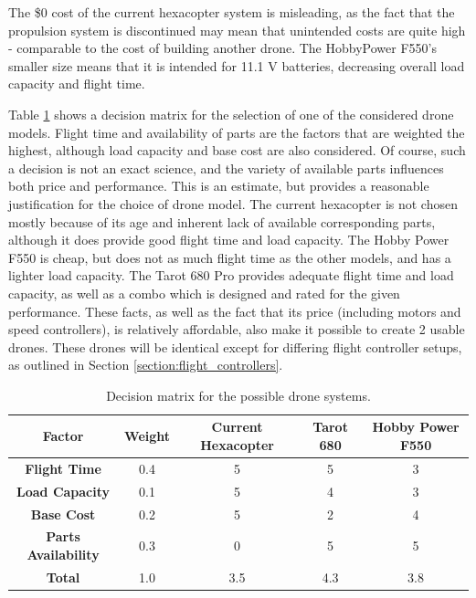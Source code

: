The \$0 cost of the current hexacopter system is misleading, as the fact that the propulsion system is discontinued may mean that unintended costs are quite high - comparable to the cost of building another drone. The HobbyPower F550's smaller size means that it is intended for 11.1 V batteries, decreasing overall load capacity and flight time.

Table \ref{tab:decision_matrix} shows a decision matrix for the selection of one of the considered drone models. Flight time and availability of parts are the factors that are weighted the highest, although load capacity and base cost are also considered. Of course, such a decision is not an exact science, and the variety of available parts influences both price and performance. This is an estimate, but provides a reasonable justification for the choice of drone model. The current hexacopter is not chosen mostly because of its age and inherent lack of available corresponding parts, although it does provide good flight time and load capacity. The Hobby Power F550 is cheap, but does not as much flight time as the other models, and has a lighter load capacity. The Tarot 680 Pro provides adequate flight time and load capacity, as well as a combo which is designed and rated for the given performance. These facts, as well as the fact that its price (including motors and speed controllers), is relatively affordable, also make it possible to create 2 usable drones. These drones will be identical except for differing flight controller setups, as outlined in Section \ref{section:flight_controllers}.

\begin{table}[ht]
    \centering
    \begin{tabular}{|c|c|c|c|c|}
    \hline
        \textbf{Factor} & \textbf{Weight} & \textbf{Current Hexacopter} & \textbf{Tarot 680} & \textbf{Hobby Power F550} \\\hline
        \textbf{Flight Time} & 0.4 & 5 & 5 & 3 \\\hline
        \textbf{Load Capacity} & 0.1 & 5 & 4 & 3 \\\hline
        \textbf{Base Cost} & 0.2 & 5 & 2 & 4 \\\hline
        \textbf{Parts Availability} & 0.3 & 0 & 5 & 5 \\\hline
        \textbf{Total} & 1.0 & 3.5 & 4.3 & 3.8 \\\hline
    \end{tabular}
    \caption{Decision matrix for the possible drone systems.}
    \label{tab:decision_matrix}
\end{table}

